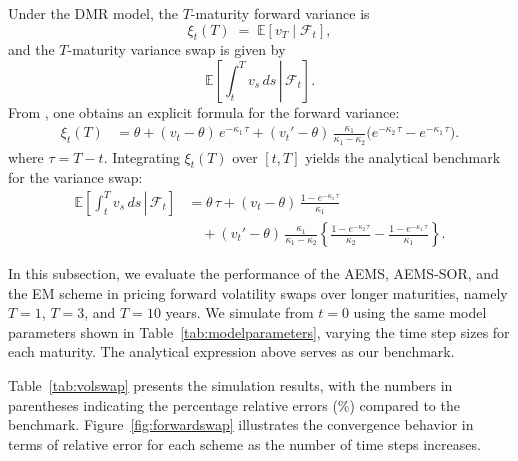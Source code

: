 \documentclass[graybox]{svmult}
\begin{document}
Under the DMR model, the $T$-maturity forward variance is
\begin{equation*}
   \xi_{t}(T) \;=\; \mathbb{E}[v_T \mid \mathcal{F}_t],
\end{equation*}
and the $T$-maturity variance swap is given by
\begin{equation*}
    \mathbb{E}\left.\left[\int_{t}^{T} v_{s}\,ds \, \right| \,  \mathcal{F}_t\right].
\end{equation*}
From \cite{bayer2013fast}, one obtains an explicit formula for the forward variance:
\begin{align*}
  \xi_{t}(T) &= \theta + (v_{t} - \theta)\, e^{-\kappa_1 \,\tau} + (v_{t}' - \theta)\,\frac{\kappa_1}{\kappa_1 - \kappa_2} 
  \bigl(e^{-\kappa_2\,\tau} - e^{-\kappa_1\,\tau}\bigr).
\end{align*}
where $\tau = T - t$. Integrating $\xi_t(T)$ over $[t, T]$ yields the analytical benchmark for the variance swap:
\begin{align*}
    \mathbb{E}\left.\left[\int_t^T v_{s}\,ds\, \right| \, \mathcal{F}_t\right]
    &= \theta\,\tau 
    + (v_t - \theta)\,\frac{1 - e^{-\kappa_1\,\tau}}{\kappa_1} \\
    &\quad + (v_t' - \theta)\,\frac{\kappa_1}{\kappa_1 - \kappa_2}
    \left\{
      \frac{1 - e^{-\kappa_2\,\tau}}{\kappa_2}
      - \frac{1 - e^{-\kappa_1\,\tau}}{\kappa_1}
    \right\}.
\end{align*}


In this subsection, we evaluate the performance of the AEMS, AEMS-SOR, and the EM scheme in pricing forward volatility swaps over longer maturities, namely $T=1$, $T=3$, and $T=10$ years. We simulate from $t=0$ using the same model parameters shown in Table~\ref{tab:modelparameters}, varying the time step sizes for each maturity. The analytical expression above serves as our benchmark.

Table~\ref{tab:volswap} presents the simulation results, with the numbers in parentheses indicating the percentage relative errors (\%) compared to the benchmark. Figure~\ref{fig:forwardswap} illustrates the convergence behavior in terms of relative error for each scheme as the number of time steps increases.
\end{document}

